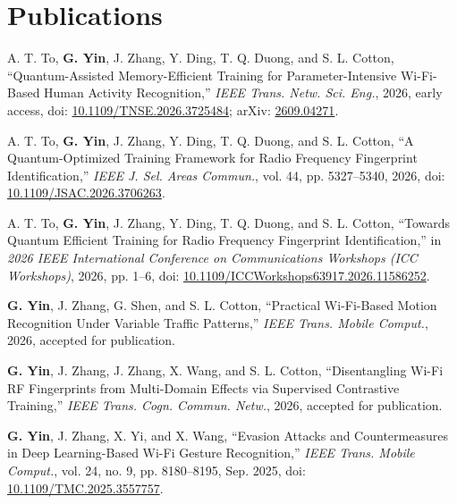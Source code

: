 \documentclass[a4paper,11pt]{article}
\begin{document}
\section{\textbf{Publications} \hfill \textcolor{darkblue}{
}}
\vspace{0.2mm}
\small{
\begin{enumerate}[leftmargin=*, labelsep=0.5em, align=left, widest={[\textbf{S.1}]}, itemindent=0em, label={\textbf{[\arabic*]}}]

\item A. T. To, \textbf{G. Yin}, J. Zhang, Y. Ding, T. Q. Duong, and S. L. Cotton, “Quantum-Assisted Memory-Efficient Training for Parameter-Intensive Wi-Fi-Based Human Activity Recognition,” \textit{IEEE Trans. Netw. Sci. Eng.}, 2026, early access, doi: \href{https://doi.org/10.1109/TNSE.2026.3725484}{10.1109/TNSE.2026.3725484}; arXiv: \href{https://arxiv.org/abs/2609.04271}{2609.04271}.
\item A. T. To, \textbf{G. Yin}, J. Zhang, Y. Ding, T. Q. Duong, and S. L. Cotton, “A Quantum-Optimized Training Framework for Radio Frequency Fingerprint Identification,” \textit{IEEE J. Sel. Areas Commun.}, vol. 44, pp. 5327--5340, 2026, doi: \href{https://doi.org/10.1109/JSAC.2026.3706263}{10.1109/JSAC.2026.3706263}.
\item A. T. To, \textbf{G. Yin}, J. Zhang, Y. Ding, T. Q. Duong, and S. L. Cotton, “Towards Quantum Efficient Training for Radio Frequency Fingerprint Identification,” in \textit{2026 IEEE International Conference on Communications Workshops (ICC Workshops)}, 2026, pp. 1--6, doi: \href{https://doi.org/10.1109/ICCWorkshops63917.2026.11586252}{10.1109/ICCWorkshops63917.2026.11586252}.
\item \textbf{G. Yin}, J. Zhang, G. Shen, and S. L. Cotton, “Practical Wi-Fi-Based Motion Recognition Under Variable Traffic Patterns,” \textit{IEEE Trans. Mobile Comput.}, 2026, accepted for publication.
\item \textbf{G. Yin}, J. Zhang, J. Zhang, X. Wang, and S. L. Cotton, “Disentangling Wi-Fi RF Fingerprints from Multi-Domain Effects via Supervised Contrastive Training,” \textit{IEEE Trans. Cogn. Commun. Netw.}, 2026, accepted for publication.
\item \textbf{G. Yin}, J. Zhang, X. Yi, and X. Wang, “Evasion Attacks and Countermeasures in Deep Learning-Based Wi-Fi Gesture Recognition,” \textit{IEEE Trans. Mobile Comput.}, vol. 24, no. 9, pp. 8180--8195, Sep. 2025, doi: \href{https://doi.org/10.1109/TMC.2025.3557757}{10.1109/TMC.2025.3557757}.

\end{enumerate}}
\end{document}
